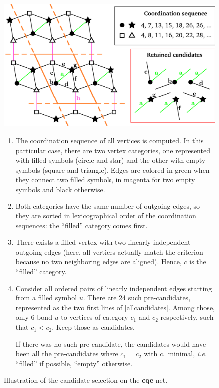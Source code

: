 \documentclass[main.tex]{subfiles}
\begin{document}
\begin{itemize}[noitemsep]
	\begin{figure}[p]
		\begin{center}
			\includegraphics[width=0.79\linewidth]{figures/topology/spacereduction.pdf}
		\end{center}
		\begin{enumerate}[itemsep=0pt]
			\item The coordination sequence of all vertices is computed. In this particular case, there are two vertex categories, one represented with filled symbols (circle and star) and the other with empty symbols (square and triangle). Edges are colored in {\color{green}green} when they connect two filled symbols, in {\color{freespeechmagenta}magenta} for two empty symbols and black otherwise.
			\item Both categories have the same number of outgoing edges, so they are sorted in lexicographical order of the coordination sequences: the ``filled'' category comes first.
			\item There exists a filled vertex with two linearly independent outgoing edges (here, all vertices actually match the criterion because no two neighboring edges are aligned). Hence, $c$ is the ``filled'' category.
			\item Consider all ordered pairs of linearly independent edges starting from a filled symbol $u$. There are 24 such pre-candidates, represented as the two first lines of \autoref{allcandidates}. Among those, only 6 bond $u$ to vertices of category $c_1$ and $c_2$ respectively, such that $c_1 < c_2$. Keep those as candidates.
			
			If there was no such pre-candidate, the candidates would have been all the pre-candidates where $c_1 = c_2$ with $c_1$ minimal, \textit{i.e.} ``filled'' if possible, ``empty'' otherwise.
		\end{enumerate}
		\caption{Illustration of the candidate selection on the {\bf cqe} net.}
		\label{candidateselection}
	\end{figure}
	

\end{itemize}
\end{document}
